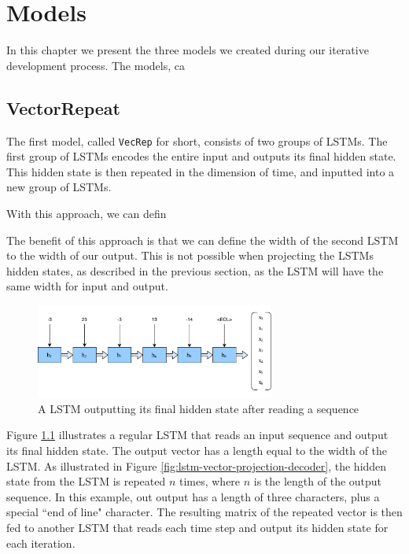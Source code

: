 
\chapter{Models}
\label{ch:models}
In this chapter we present the three models we created during our iterative development process. The models, ca


\section{VectorRepeat}
The first model, called {\tt VecRep} for short, consists of two groups of LSTMs. The first group of LSTMs encodes the entire input and outputs its final hidden state. This hidden state is then repeated in the dimension of time, and inputted into a new group of LSTMs. 

With this approach, we can defin

The benefit of this approach is that we can define the width of the second LSTM to the width of our output. This is not possible when projecting the LSTMs hidden states, as described in the previous section, as the LSTM will have the same width for input and output.

\begin{figure}[ht]
    \centering
    \includegraphics[width=0.7\textwidth]{fig/development_process/lstm-vector-projection-encoder.pdf}
    \caption{A LSTM outputting its final hidden state after reading a sequence}
    \label{fig:lstm-vector-projection-encoder}
\end{figure}

Figure \ref{fig:lstm-vector-projection-encoder} illustrates a regular LSTM that reads an input sequence and output its final hidden state. The output vector has a length equal to the width of the LSTM. As illustrated in Figure \ref{fig:lstm-vector-projection-decoder}, the hidden state from the LSTM is repeated \(n\) times, where \(n\) is the length of the output sequence. In this example, out output has a length of three characters, plus a special ``end of line" character. The resulting matrix of the repeated vector is then fed to another LSTM that reads each time step and output its hidden state for each iteration.

